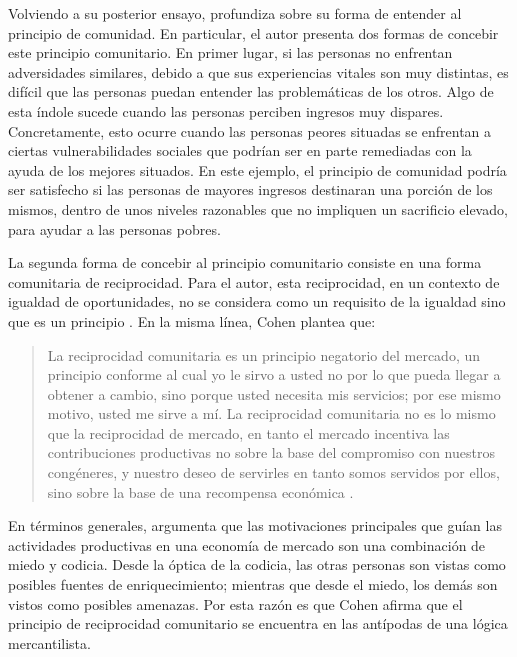 Volviendo a su posterior ensayo, \citet{Cohen_2014c} profundiza sobre su forma de entender al principio de comunidad. En particular, el autor presenta dos formas de concebir este principio comunitario. En primer lugar, si las personas no enfrentan adversidades similares, debido a que sus experiencias vitales son muy distintas, es difícil que las personas puedan entender las problemáticas de los otros. Algo de esta índole sucede cuando las personas perciben ingresos muy dispares. Concretamente, esto ocurre cuando las personas peores situadas se enfrentan a ciertas vulnerabilidades sociales que podrían ser en parte remediadas con la ayuda de los mejores situados. En este ejemplo, el principio de comunidad podría ser satisfecho si las personas de mayores ingresos destinaran una porción de los mismos, dentro de unos niveles razonables que no impliquen un sacrificio elevado, para ayudar a las personas pobres.

La segunda forma de concebir al principio comunitario consiste en una forma comunitaria de reciprocidad. Para el autor, esta reciprocidad, en un contexto de igualdad de oportunidades, no se considera como un requisito de la igualdad sino que es un principio  \citep[p. 193]{Cohen_2014c}. En la misma línea, Cohen plantea que:

\vspace{3mm}
\begin{quote}
    La reciprocidad comunitaria es un principio negatorio del mercado, un principio conforme al cual yo le sirvo a usted no por lo que pueda llegar a obtener a cambio, sino porque usted necesita mis servicios; por ese mismo motivo, usted me sirve a mí. La reciprocidad comunitaria no es lo mismo que la reciprocidad de mercado, en tanto el mercado incentiva las contribuciones productivas no sobre la base del compromiso con nuestros congéneres, y nuestro deseo de servirles en tanto somos servidos por ellos, sino sobre la base de una recompensa económica \citep[p. 193]{Cohen_2014c}.
\end{quote}
\vspace{3mm}

En términos generales, \citet{Cohen_2014c} argumenta que las motivaciones principales que guían las actividades productivas en una economía de mercado son una combinación de miedo y codicia. Desde la óptica de la codicia, las otras personas son vistas como posibles fuentes de enriquecimiento; mientras que desde el miedo, los demás son vistos como posibles amenazas. Por esta razón es que Cohen afirma que el principio de reciprocidad comunitario se encuentra en las antípodas de una lógica mercantilista.

